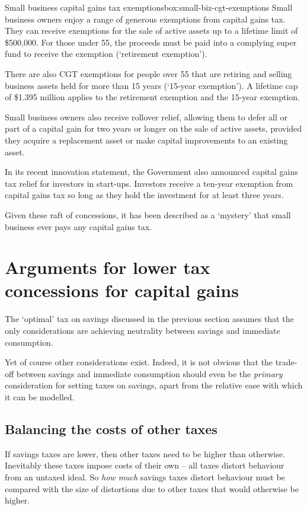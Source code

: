 \documentclass{grattanAlpha}\usepackage[]{graphicx}\usepackage[]{color}
\begin{document}
\begin{smallbox}{Small business capital gains tax exemptions}{box:small-biz-cgt-exemptions}
Small business owners enjoy a range of generous exemptions from capital gains tax.  
They can receive exemptions for the sale of active assets up to a lifetime limit of \$500,000. For those under 55, the proceeds must be paid into a complying super fund to receive the exemption (‘retirement exemption’). 

There are also CGT exemptions for people over 55 that are retiring and selling business assets held for more than 15 years (‘15-year exemption’). A lifetime cap of \$1.395 million applies to the retirement exemption and the 15-year exemption. 

Small business owners also receive rollover relief, allowing them to defer all or part of a capital gain for two years or longer on the sale of active assets, provided they acquire a replacement asset or make capital improvements to an existing asset.

In its recent innovation statement, the Government also announced capital gains tax relief for investors in start-ups. Investors receive a ten-year exemption from capital gains tax so long as they hold the investment for at least three years.

Given these raft of concessions, it has been described as a ‘mystery’ that small business ever pays any capital gains tax.

\end{smallbox}


\section{Arguments for lower tax concessions for capital gains}\label{subsec:arguments-lower-tax-concessions-for-capital-gains}

The ‘optimal’ tax on savings discussed in the previous section assumes that the only considerations are achieving neutrality between savings and immediate consumption.

Yet of course other considerations exist. Indeed, it is not obvious that the trade-off between savings and immediate consumption should even be the \emph{primary} consideration for setting taxes on savings, apart from the relative ease with which it can be modelled.
\subsection{Balancing the costs of other taxes}
If savings taxes are lower, then other taxes need to be higher than otherwise. Inevitably these taxes impose costs of their own – all taxes distort behaviour from an untaxed ideal. So \emph{how much} savings taxes distort behaviour must be compared with the size of distortions due to other taxes that would otherwise be higher.
\end{document}
